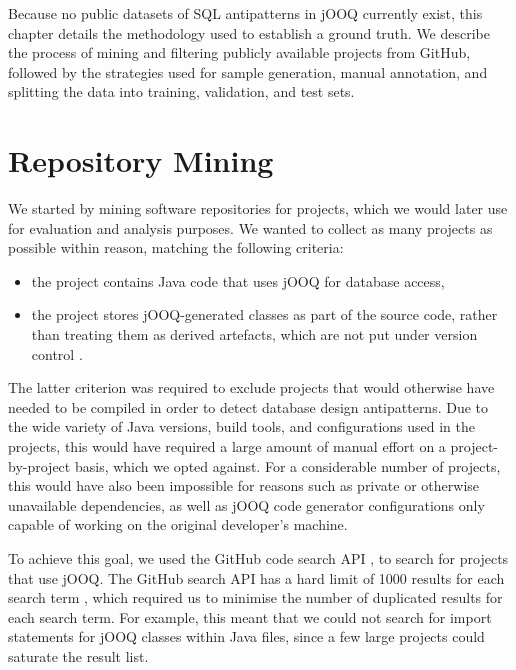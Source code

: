 Because no public datasets of SQL antipatterns in jOOQ currently exist, this chapter details the methodology used to establish a ground truth. We describe the process of mining and filtering publicly available projects from GitHub, followed by the strategies used for sample generation, manual annotation, and splitting the data into training, validation, and test sets.

\section{Repository Mining}\label{sec:mining}

We started by mining software repositories for projects, which we would later use for evaluation and analysis purposes. We wanted to collect as many projects as possible within reason, matching the following criteria:
\begin{itemize}
    \item the project contains Java code that uses jOOQ for database access,
    \item the project stores jOOQ-generated classes as part of the source code, rather than treating them as derived artefacts, which are not put under version control .
\end{itemize}

The latter criterion was required to exclude projects that would otherwise have needed to be compiled in order to detect database design antipatterns. Due to the wide variety of Java versions, build tools, and configurations used in the projects, this would have required a large amount of manual effort on a project-by-project basis, which we opted against. For a considerable number of projects, this would have also been impossible for reasons such as private or otherwise unavailable dependencies, as well as jOOQ code generator configurations only capable of working on the original developer's machine.

To achieve this goal, we used the GitHub code search API , to search for projects that use jOOQ. The GitHub search API has a hard limit of \num{1000} results for each search term , which required us to minimise the number of duplicated results for each search term. For example, this meant that we could not search for import statements for jOOQ classes within Java files, since a few large projects could saturate the result list.

